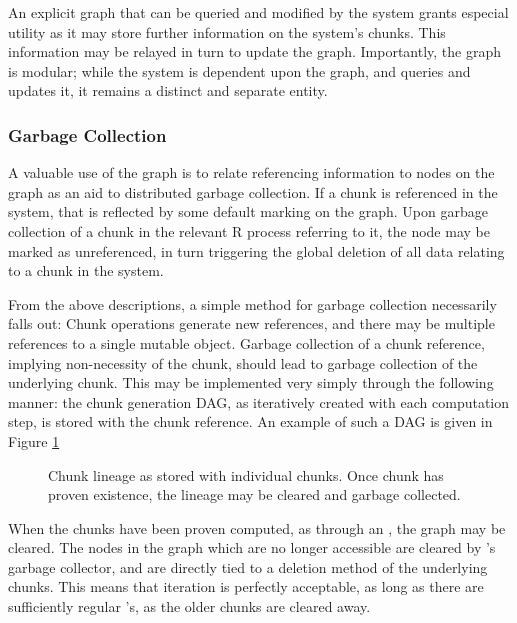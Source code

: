 An explicit graph that can be queried and modified by the system grants especial utility as it may store further information on the system's chunks.
This information may be relayed in turn to update the graph.
Importantly, the graph is modular; while the system is dependent upon the graph, and queries and updates it, it remains a distinct and separate entity.

\subsubsection{Garbage Collection}\label{sec:gc}

A valuable use of the graph is to relate referencing information to nodes on the graph as an aid to distributed garbage collection.
If a chunk is referenced in the system, that is reflected by some default marking on the graph.
Upon garbage collection of a chunk in the relevant R process referring to it, the node may be marked as unreferenced, in turn triggering the global deletion of all data relating to a chunk in the system.

From the above descriptions, a simple method for garbage collection necessarily falls out:
Chunk operations generate new references, and there may be multiple references to a single mutable object.
Garbage collection of a chunk reference, implying non-necessity of the chunk, should lead to garbage collection of the underlying chunk.
This may be implemented very simply through the following manner: the chunk generation DAG, as iteratively created with each computation step, is stored with the chunk reference.
An example of such a DAG is given in Figure \ref{fig:gc}

\begin{figure}

\caption{Chunk lineage as stored with individual chunks. Once chunk has proven existence, the lineage may be cleared and garbage collected.}
\label{fig:gc}
\end{figure}

When the chunks have been proven computed, as through an , the graph may be cleared.
The nodes in the graph which are no longer accessible are cleared by \R's garbage collector, and are directly tied to a deletion method of the underlying chunks.
This means that iteration is perfectly acceptable, as long as there are sufficiently regular 's, as the older chunks are cleared away.
